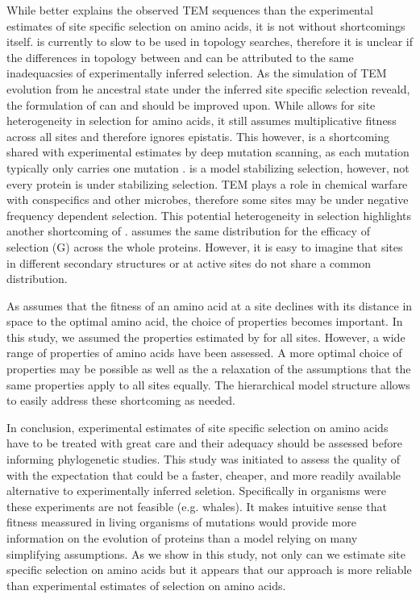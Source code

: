 \documentclass[12pt]{article}
\begin{document}
While \selac better explains the observed TEM sequences than the experimental estimates of site specific selection on amino acids, it is not without shortcomings itself.
\selac is currently to slow to be used in topology searches, therefore it is unclear if the differences in topology between \phydms and \selac can be attributed to the same inadequacsies of experimentally inferred selection.
As the simulation of TEM evolution from he ancestral state under the \selac inferred site specific selection reveald, the formulation of \selac can and should be improved upon.
While \selac allows for site heterogeneity in selection for amino acids, it still assumes multiplicative fitness across all sites and therefore ignores epistatis.
This however, is a shortcoming shared with experimental estimates by deep mutation scanning, as each mutation typically only carries one mutation \citep{FirnbergAndOstermeier2012, Jain2014}.
\selac is a model stabilizing selection, however, not every protein is under stabilizing selection.
TEM plays a role in chemical warfare with conspecifics and other microbes, therefore some sites may be under negative frequency dependent selection.
This potential heterogeneity in selection highlights another shortcoming of \selac.
\selac assumes the same distribution for the efficacy of selection (G) across the whole proteins.
However, it is easy to imagine that sites in different secondary structures or at active sites do not share a common distribution.


As \selac assumes that the fitness of an amino acid at a site declines with its distance in \PC space to the optimal amino acid, the choice of \PC properties becomes important.
In this study, we assumed the \PC properties estimated by \citet{grantham1974} for all sites.
However, a wide range of \PC properties of amino acids have been assessed.
A more optimal choice of \PC properties may be possible as well as the a relaxation of the assumptions that the same properties apply to all sites equally.
The hierarchical model structure allows to easily address these shortcoming as needed.

In conclusion, experimental estimates of site specific selection on amino acids have to be treated with great care and their adequacy should be assessed before informing phylogenetic studies.
This study was initiated to assess the quality of \selac with the expectation that \selac could be a faster, cheaper, and more readily available alternative to experimentally inferred seletion.
Specifically in organisms were these experiments are not feasible (e.g. whales).
It makes intuitive sense that fitness meassured in living organisms of mutations would provide more information on the evolution of proteins than a model relying on many simplifying assumptions.
As we show in this study, not only can we estimate site specific selection on amino acids but it appears that our approach is more reliable than experimental estimates of selection on amino acids.
\end{document}
